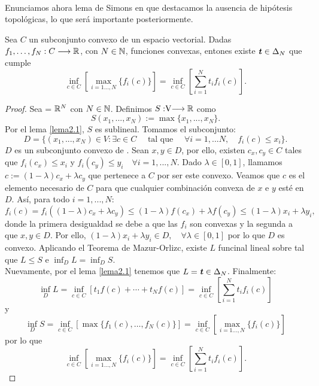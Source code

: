 	\paragraph{} Enunciamos ahora lema de Simons \cite{Simons2008} en que destacamos la ausencia de hipótesis topológicas, lo que será importante posteriormente.
	
	\begin{lemaBox}\label{Simons}
		Sea $ C $ un subconjunto convexo de un espacio vectorial. Dadas $ f_1, \dots, f_N : C \longrightarrow \mathbb{R} $, con $ N \in \mathbb{N} $, funciones convexas, entones existe $ \textbf{\emph{t}} \in \Delta_N $ que cumple
		\[
		\inf_{c \in C}\left[ \max_{i=1\dots,N } \{f_i(c)\}\right] = \inf_{c \in C} \left[ \sum_{i=1}^{N} t_i f_i(c) \right].
		\] 
	\end{lemaBox}
	\begin{proof}
		Sea  \vecSpace = $ \mathbb{R}^N $ con $ N \in \mathbb{N} $. Definimos $S:\vecSpace \longrightarrow \RR $ como \[ S(x_1, ..., x_N) := \max \{x_1, ..., x_N\}. \] Por el lema \ref{lema2.1}, $ S $ es sublineal. Tomamos el subconjunto:
		\[ 
		D = \{ (x_1, ..., x_N)\in V: \exists c \in C \quad \text{ tal que } \quad \forall i = 1,...N,\quad f_i(c) \leq x_i \}.
		\]
		$ D $ es un subconjunto convexo de \vecSpace. Sean $ x, y \in D $, por ello, existen $ c_x, c_y \in C $ tales que $ f_i (c_x) \leq x_i  $ y $ f_i (c_y) \leq y_i \quad \forall i=1,...,N $. Dado $ \lambda \in [0,1] $, llamamos $ c := (1-\lambda)c_x + \lambda c_y $ que pertenece a $ C $ por ser este convexo. Veamos que $ c $ es el elemento necesario de $ C $ para que cualquier combinación convexa de $ x $ e $ y $ esté en $ D $. Así, para todo $ i =1,...,N  $:	
		\[
		f_i(c) = f_i((1-\lambda)c_x + \lambda c_y) \leq (1-\lambda)f(c_x) + \lambda f(c_y) \leq (1-\lambda)x_i + \lambda y_i ,
		\]
		donde la primera desigualdad se debe a que las $ f_i $ son convexas y la segunda a que $ x,y \in D $. Por ello, $ (1-\lambda)x_i + \lambda y_i \in D , \quad \forall \lambda \in [0,1] $ por lo que $ D $ es convexo. Aplicando el Teorema de Mazur-Orlizc, existe $ L $ funcinal lineal sobre \vecSpace tal que $ L \leq S $ e $ \inf_D L = \inf_D S $. \\
		
		Nuevamente, por el lema \ref{lema2.1} tenemos que $ L = \textbf{\emph{t}} \in \Delta_N$. Finalmente:
		\[
		\inf_D L = \inf_{c\in C} \left[ t_1 f(c) + \cdots+ t_N f(c) \right] =\inf_{c \in C} \left[ \sum_{i=1}^{N} t_i f_i(c) \right]
		\]
		y
		\[
		\inf_D S = \inf_{c\in C} \left[ \max \{f_1(c), \dots, f_N(c)\} \right] = \inf_{c \in C}\left[ \max_{i=1\dots,N } \{f_i(c)\}\right]
		\]
		por lo que 
		\[ \inf_{c \in C}\left[ \max_{i=1\dots,N } \{f_i(c)\}\right] = \inf_{c \in C} \left[ \sum_{i=1}^{N} t_i f_i(c) \right]. \] 
	\end{proof}

